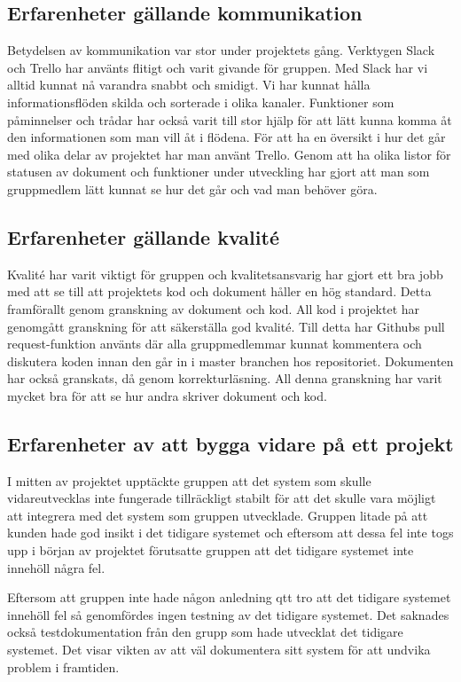 \subsection{Erfarenheter gällande kommunikation}

Betydelsen av kommunikation var stor under projektets gång. Verktygen Slack och Trello har använts flitigt och varit givande för gruppen. Med Slack har vi alltid kunnat nå varandra snabbt och smidigt. Vi har kunnat hålla informationsflöden skilda och sorterade i olika kanaler. Funktioner som påminnelser och trådar har också varit till stor hjälp för att lätt kunna komma åt den informationen som man vill åt i flödena. För att ha en översikt i hur det går med olika delar av projektet har man använt Trello. Genom att ha olika listor för statusen av dokument och funktioner under utveckling har gjort att man som gruppmedlem lätt kunnat se hur det går och vad man behöver göra. 


\subsection{Erfarenheter gällande kvalité}

Kvalité har varit viktigt för gruppen och kvalitetsansvarig har gjort ett bra jobb med att se till att projektets kod och dokument håller en hög standard. Detta framförallt genom granskning av dokument och kod. All kod i projektet har genomgått granskning för att säkerställa god kvalité. Till detta har Githubs pull request-funktion använts där alla gruppmedlemmar kunnat kommentera och diskutera koden innan den går in i master branchen hos repositoriet. Dokumenten har också granskats, då genom korrekturläsning. All denna granskning har varit mycket bra för att se hur andra skriver dokument och kod.

\subsection{Erfarenheter av att bygga vidare på ett projekt}

I mitten av projektet upptäckte gruppen att det system som skulle vidareutvecklas inte fungerade tillräckligt stabilt för att det skulle vara möjligt att integrera med det system som gruppen utvecklade. Gruppen litade på att kunden hade god insikt i det tidigare systemet och eftersom att dessa fel inte togs upp i början av projektet förutsatte gruppen att det tidigare systemet inte innehöll några fel.

Eftersom att gruppen inte hade någon anledning qtt tro att det tidigare systemet innehöll fel så genomfördes ingen testning av det tidigare systemet. Det saknades också testdokumentation från den grupp som hade utvecklat det tidigare systemet. Det visar vikten av att väl dokumentera sitt system för att undvika problem i framtiden.


